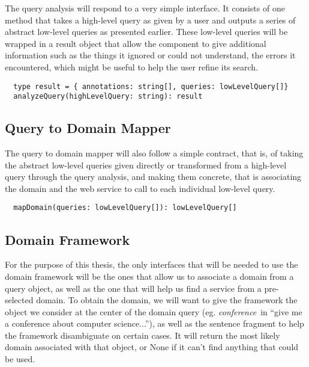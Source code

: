 The query analysis will respond to a very simple interface. It consists of one method that takes a high-level query as given by a user and outputs a series of abstract low-level queries as presented earlier. These low-level queries will be wrapped in a result object that allow the component to give additional information such as the things it ignored or could not understand, the errors it encountered, which might be useful to help the user refine its search.

\begin{verbatim}
  type result = { annotations: string[], queries: lowLevelQuery[]}
  analyzeQuery(highLevelQuery: string): result
\end{verbatim}


\subsection{Query to Domain Mapper} %
\label{sub:query_to_domain_mapper_int}

The query to domain mapper will also follow a simple contract, that is, of taking the abstract low-level queries given directly or transformed from a high-level query through the query analysis, and making them concrete, that is associating the domain and the web service to call to each individual low-level query.

\begin{verbatim}
  mapDomain(queries: lowLevelQuery[]): lowLevelQuery[]
\end{verbatim}


\subsection{Domain Framework} %
\label{sub:domain_framework}

For the purpose of this thesis, the only interfaces that will be needed to use the domain framework will be the ones that allow us to associate a domain from a query object, as well as the one that will help us find a service from a pre-selected domain. To obtain the domain, we will want to give the framework the object we consider at the center of the domain query (eg. \emph{conference}\ in ``give me a conference about computer science...''), as well as the sentence fragment to help the framework disambiguate on certain cases. It will return the most likely domain associated with that object, or None if it can't find anything that could be used.


